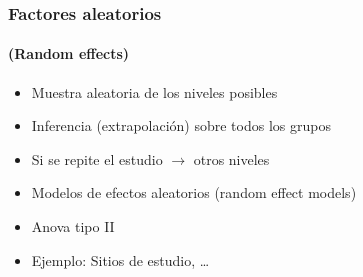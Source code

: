 \documentclass[gray,handout,mathserif]{beamer}
\begin{document}
 
\begin{frame}[label=encours]
   \frametitle{Factores aleatorios}
   \framesubtitle{(Random effects)}
    \begin{itemize}
         \item Muestra aleatoria de los niveles posibles
         \item Inferencia (extrapolaci\'on) sobre todos los grupos
         \item Si se repite el estudio $\rightarrow$ otros niveles
         \item Modelos de efectos aleatorios (random effect models)
         \item Anova tipo II
         \item Ejemplo: Sitios de estudio, \ldots
   \end{itemize}
\end{frame}%
\end{document}
